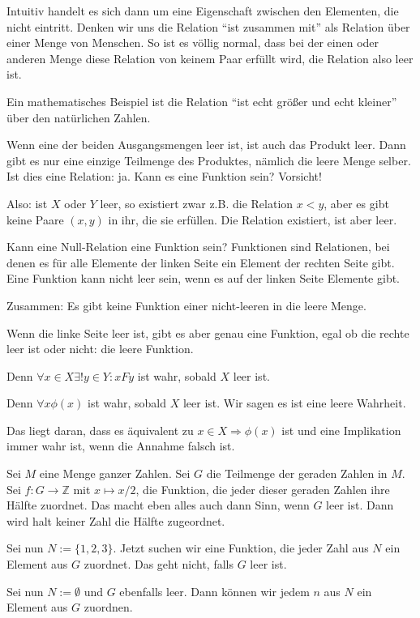 \documentclass[a4paper]{amsart}
\theoremstyle{definition}
\newcommand{\Z}{\ensuremath{\mathbb{ Z }}}
\begin{document}
Intuitiv handelt es sich dann um eine Eigenschaft zwischen den Elementen, die nicht eintritt. Denken wir uns die Relation "`ist zusammen mit"' als Relation über einer Menge von Menschen. So ist es völlig normal, dass bei der einen oder anderen Menge diese Relation von keinem Paar erfüllt wird, die Relation also leer ist.

Ein mathematisches Beispiel ist die Relation "`ist echt größer und echt kleiner"' über den natürlichen Zahlen.

Wenn eine der beiden Ausgangsmengen leer ist, ist auch das Produkt leer. Dann gibt es nur eine einzige Teilmenge des Produktes, nämlich die leere Menge selber. Ist dies eine Relation: ja. Kann es eine Funktion sein? Vorsicht!

Also: ist $X$ oder $Y$ leer, so existiert zwar z.B. die Relation $x < y$, aber es gibt keine Paare $(x, y)$ in ihr, die sie erfüllen. Die Relation existiert, ist aber leer.

Kann eine Null-Relation eine Funktion sein? Funktionen sind Relationen, bei denen es für alle Elemente der linken Seite ein Element der rechten Seite gibt. Eine Funktion kann nicht leer sein, wenn es auf der linken Seite Elemente gibt. 

Zusammen: Es gibt keine Funktion einer nicht-leeren in die leere Menge.

Wenn die linke Seite leer ist, gibt es aber genau eine Funktion, egal ob die rechte leer ist oder nicht: die leere Funktion.

Denn $\forall x \in X \exists!y \in Y \colon xFy$ ist wahr, sobald $X$ leer ist.

Denn $\forall x \phi(x)$ ist wahr, sobald $X$ leer ist. Wir sagen es ist eine leere Wahrheit.

Das liegt daran, dass es äquivalent zu $x \in X \Rightarrow \phi(x)$ ist und eine Implikation immer wahr ist, wenn die Annahme falsch ist.

Sei $M$ eine Menge ganzer Zahlen. Sei $G$ die Teilmenge der geraden Zahlen in $M$. Sei $f \colon G \to \Z$ mit $x \mapsto x/2$, die Funktion, die jeder dieser geraden Zahlen ihre Hälfte zuordnet. Das macht eben alles auch dann Sinn, wenn $G$ leer ist. Dann wird halt keiner Zahl die Hälfte zugeordnet.

Sei nun $N := \{1,2,3\}$. Jetzt suchen wir eine Funktion, die jeder Zahl aus $N$ ein Element aus $G$ zuordnet. Das geht nicht, falls $G$ leer ist.

Sei nun $N := \emptyset$ und $G$ ebenfalls leer. Dann können wir jedem $n$ aus $N$ ein Element aus $G$ zuordnen. 
 
\end{document}
